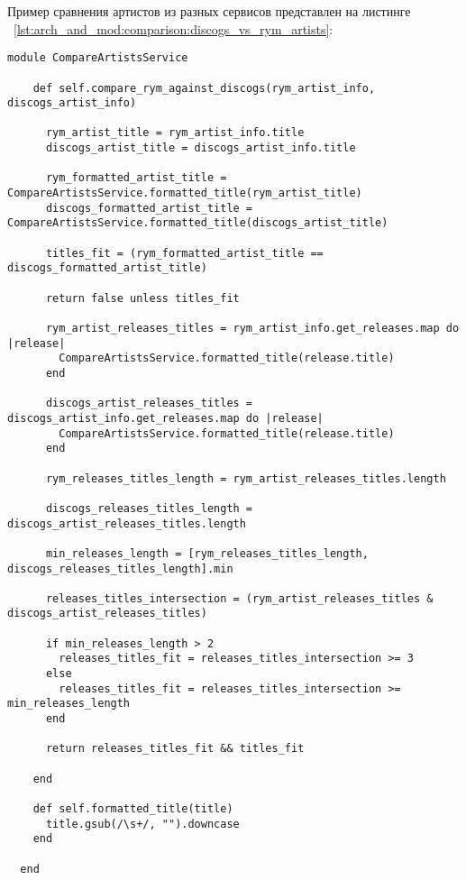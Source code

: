 Пример сравнения артистов из разных сервисов представлен на листинге ~\ref{lst:arch_and_mod:comparison:discogs_vs_rym_artists}:

\begin{lstlisting}[style=fsharpstyle,caption={Пример сравнения артистов из разных сервисов}, label=lst:arch_and_mod:comparison:discogs_vs_rym_artists]
  module CompareArtistsService

    def self.compare_rym_against_discogs(rym_artist_info, discogs_artist_info)

      rym_artist_title = rym_artist_info.title
      discogs_artist_title = discogs_artist_info.title

      rym_formatted_artist_title = CompareArtistsService.formatted_title(rym_artist_title)
      discogs_formatted_artist_title = CompareArtistsService.formatted_title(discogs_artist_title)

      titles_fit = (rym_formatted_artist_title == discogs_formatted_artist_title)

      return false unless titles_fit

      rym_artist_releases_titles = rym_artist_info.get_releases.map do |release|
        CompareArtistsService.formatted_title(release.title)
      end

      discogs_artist_releases_titles = discogs_artist_info.get_releases.map do |release|
        CompareArtistsService.formatted_title(release.title)
      end

      rym_releases_titles_length = rym_artist_releases_titles.length

      discogs_releases_titles_length = discogs_artist_releases_titles.length

      min_releases_length = [rym_releases_titles_length, discogs_releases_titles_length].min

      releases_titles_intersection = (rym_artist_releases_titles & discogs_artist_releases_titles)

      if min_releases_length > 2
        releases_titles_fit = releases_titles_intersection >= 3
      else
        releases_titles_fit = releases_titles_intersection >= min_releases_length
      end

      return releases_titles_fit && titles_fit

    end

    def self.formatted_title(title)
      title.gsub(/\s+/, "").downcase
    end

  end
\end{lstlisting}


